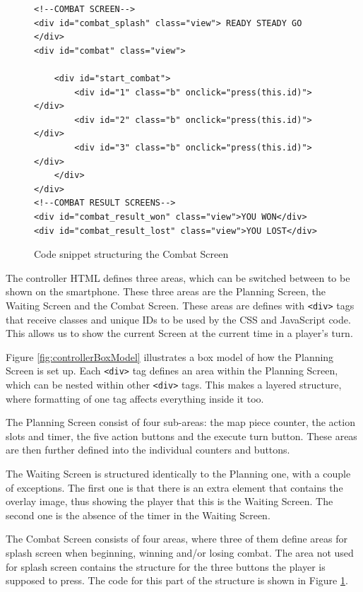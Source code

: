 \begin{figure}
\begin{lstlisting}
<!--COMBAT SCREEN-->
<div id="combat_splash" class="view"> READY STEADY GO </div>
<div id="combat" class="view">

	<div id="start_combat">
		<div id="1" class="b" onclick="press(this.id)"></div>
		<div id="2" class="b" onclick="press(this.id)"></div>
		<div id="3" class="b" onclick="press(this.id)"></div>
	</div>
</div>
<!--COMBAT RESULT SCREENS-->
<div id="combat_result_won" class="view">YOU WON</div>
<div id="combat_result_lost" class="view">YOU LOST</div>
\end{lstlisting}
\caption{Code snippet structuring the Combat Screen \label{HTMLex}}
\end{figure}

The controller HTML defines three areas, which can be switched between to be shown on the smartphone. These three areas are the Planning Screen, the Waiting Screen and the Combat Screen. These areas are defines with \texttt{<div>} tags that receive classes and unique IDs to be used by the CSS and JavaScript code. This allows us to show the current Screen at the current time in a player's turn.

Figure \ref{fig:controllerBoxModel} illustrates a box model of how the Planning Screen is set up. Each \texttt{<div>} tag defines an area within the Planning Screen, which can be nested within other \texttt{<div>} tags. This makes a layered structure, where formatting of one tag affects everything inside it too.

The Planning Screen consist of four sub-areas: the map piece counter, the action slots and timer, the five action buttons and the execute turn button. These areas are then further defined into the individual counters and buttons.

The Waiting Screen is structured identically to the Planning one, with a couple of exceptions. The first one is that there is an extra element that contains the overlay image, thus showing the player that this is the Waiting Screen. The second one is the absence of the timer in the Waiting Screen.

The Combat Screen consists of four areas, where three of them define areas for splash screen when beginning, winning and/or losing combat. The area not used for splash screen contains the structure for the three buttons the player is supposed to press. The code for this part of the structure is shown in Figure \ref{HTMLex}.

